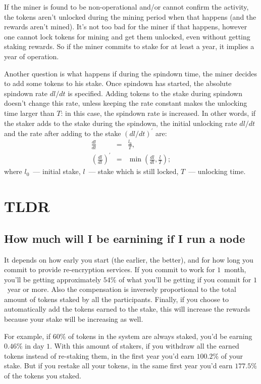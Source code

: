 \documentclass[longbibliography,nofootinbib,twocolumn]{revtex4-1}
\begin{document}
If the miner is found to be non-operational and/or cannot confirm the activity, the tokens aren't unlocked during the mining period when that happens (and the
rewards aren't mined).
It's not too bad for the miner if that happens, however one cannot lock tokens for mining and get them unlocked, even without getting staking rewards.
So if the miner commits to stake for at least a year, it implies a year of operation.

Another question is what happens if during the spindown time, the miner decides to add some tokens to his stake.
Once spindown has started, the absolute spindown rate $dl/dt$ is specified.
Adding tokens to the stake during spindown doesn't change this rate, unless keeping the rate constant makes the unlocking time larger than $T$:
in this case, the spindown rate is increased.
In other words, if the staker adds to the stake during the spindown, the initial unlocking rate $dl/dt$ and the rate after adding to the stake
$(dl/dt)^{\prime}$ are:
\begin{eqnarray}
    \frac{dl}{dt} &=& \frac{l_0}{T},\\
    \left(\frac{dl}{dt}\right)^{\prime} &=& \min\left( \frac{dl}{dt}, \frac{l}{T}\right);
\end{eqnarray}
where $l_0$~--- initial stake, $l$~--- stake which is still locked, $T$~--- unlocking time.

\section{TLDR}

\subsection{How much will I be earnining if I run a node}
It depends on how early you start (the earlier, the better), and for how long you commit to provide re-encryption services.
If you commit to work for $1$~month, you'll be getting approximately $54\%$ of what you'll be getting if you commit for $1$~year or more.
Also the compensation is inversely proportional to the total amount of tokens staked by all the participants.
Finally, if you choose to automatically add the tokens earned to the stake, this will increase the rewards because your stake will be increasing as well.

For example, if $60\%$ of tokens in the system are always staked, you'd be earning $0.46\%$ in day $1$.
With this amount of stakers, if you withdraw all the earned tokens instead of re-staking them, in the first year you'd earn $100.2\%$ of your stake.
But if you restake all your tokens, in the same first year you'd earn $177.5\%$ of the tokens you staked.
\end{document}
